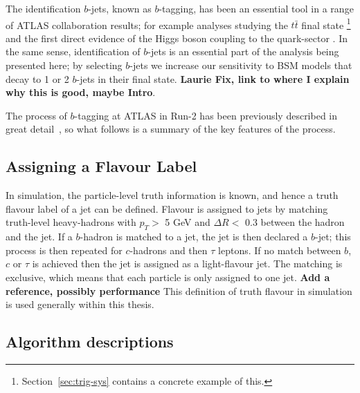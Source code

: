 The identification $b$-jets, known as $b$-tagging, has been an essential tool in a range of ATLAS collaboration results;
for example analyses studying the $t\bar{t}$ final state \cite{obj-ttbar} \footnote{Section~\ref{sec:trig-sys} contains a concrete example of this.}
and the first direct evidence of the Higgs boson coupling to the quark-sector \cite{obj-Hbb}.
In the same sense, identification of $b$-jets is an essential part of the analysis being presented here;
by selecting $b$-jets we increase our sensitivity to BSM models that decay to 1 or 2 $b$-jets in their final state.
\textbf{Laurie Fix, link to where I explain why this is good, maybe Intro}.

The process of $b$-tagging at ATLAS in Run-2 has been previously described in great
detail~\cite{obj-bjets_algo_2015,obj-bjets_algo_2016},
so what follows is a summary of the key features of the process.

\subsection{Assigning a Flavour Label}
\label{sec:obj-bjets_label}

In simulation, the particle-level truth information is known, and hence a truth flavour label of a jet can be defined.
Flavour is assigned to jets by matching truth-level heavy-hadrons with $p_{T} >$ 5 GeV and $\Delta R <$ 0.3 between the hadron and the jet.
If a $b$-hadron is matched to a jet, the jet is then declared a $b$-jet;
this process is then repeated for $c$-hadrons and then $\tau$ leptons.
If no match between $b$, $c$ or $\tau$ is achieved then the jet is assigned as a light-flavour jet.
The matching is exclusive, which means that each particle is only assigned to one jet. \textbf{Add a reference, possibly performance}
This definition of truth flavour in simulation is used generally within this thesis.
   
\subsection{Algorithm descriptions}

